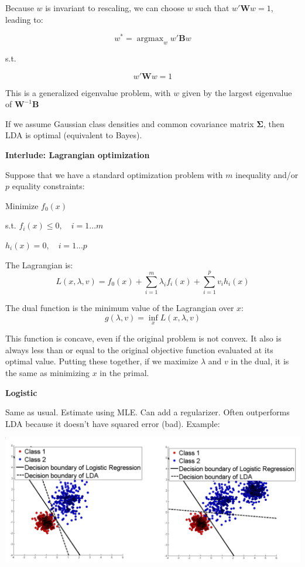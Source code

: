 \documentclass{minimal}
\DeclareMathOperator*{\argmax}{argmax}
\begin{document}
Because $w$ is invariant to rescaling, we can choose $w$ such that
$w'\mathbf{W}w=1$, leading to:

$$
w^* = \argmax_w w'\mathbf{B}w 
$$
\begin{center}
s.t.
\end{center}
$$
w'\mathbf{W}w=1
$$

This is a generalized eigenvalue problem, with $w$ given by the largest
eigenvalue of $\mathbf{W}^{-1}\mathbf{B}$

\smallskip

If we assume Gaussian class densities and common covariance matrix
$\mathbf{\Sigma}$, then LDA is optimal (equivalent to Bayes).

\medskip

\textbf{Interlude: Lagrangian optimization}

Suppose that we have a standard optimization problem with $m$ inequality and/or
$p$ equality constraints:

\smallskip

Minimize $f_0(x)$

s.t. $f_i(x) \leq 0, \quad i=1...m$

$h_i(x)=0, \quad i = 1...p$

The Lagrangian is:
$$
L(x, \lambda, v) = f_0(x) + \sum_{i=1}^m \lambda_if_i(x) + \sum_{i=1}^p v_i
h_i(x)
$$

The dual function is the minimum value of the Lagrangian over $x$:
$$
g(\lambda, v) = \inf_x L(x, \lambda, v)
$$

This function is concave, even if the original problem is not convex. It also is
always less than or equal to the original objective function evaluated at its
optimal value. Putting these together, if we maximize $\lambda$ and $v$ in the dual, it is the same
as minimizing $x$ in the primal.

\medskip

\textbf{Logistic}

Same as usual. Estimate using MLE. Can add a regularizer. Often outperforms LDA
because it doesn't have squared error (bad). Example:

\includegraphics[scale=0.25]{log}
\end{document}
